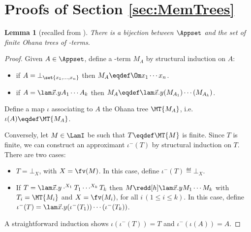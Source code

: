 \documentclass[10pt,a4paper]{amsart}
\newtheorem{lemma}[theorem]{Lemma}
\theoremstyle{definition}
\begin{document}

\section{Proofs of Section \ref{sec:MemTrees}}

\begin{lemma}[recalled from ]
	There is a bijection between $\Appset$ and the set of finite Ohana 
	trees of \lamI-terms.
\end{lemma}

	\begin{proof}
	Given $A\in\Appset$, define a \lamI-term $M_A$ 
	by structural induction on $A$:
	\begin{itemize}
	\item if $A = \bot_{\set{x_1,\dots,x_n}}$ then 
		$M_A\eqdef \Om x_1\cdots x_n$.
	\item if $A = \lam\vec x.yA_1\cdots A_k$ then 
		$M_A \eqdef \lam\vec x.y(M_{A_1})\cdots (M_{A_k})$.
	\end{itemize}
	Define a map $\iota$ associating to $A$ the Ohana tree $\MT{M_A}$, 
	i.e.\ $\iota(A) \eqdef \MT{M_A}$.
	
	Conversely, let $M\in\LamI$ be such that $T\eqdef\MT{M}$ is finite. 
	Since $T$ is finite, we can construct an approximant $\iota^-(T)$ 
	by structural induction on $T$. There are two cases:
	\begin{itemize}
	\item $T = \bot_X$, with $X = \fv(M)$. 
		In this case, define $\iota^-(T) \eqdef \bot_X$.
	\item If $T = \lam\vec x.y\cdot^{X_1}T_1\cdots^{X_k} T_k$ then 
		$M\redd[h] \lam\vec x.yM_1\cdots M_k$ with $T_i = \MT{M_i}$ 
		and $X = \fv(M_i)$, for all $i\,(1\le i\le k)$. 
		In this case, define $\iota^-(T) = 
		\lam\vec x.y(\iota^-(T_1))\cdots (\iota^-(T_k))$.
	\end{itemize}
	A straightforward induction shows $\iota(\iota^-(T)) = T$ and 
	$\iota^-(\iota(A)) = A$.
	\end{proof}
\end{document}
